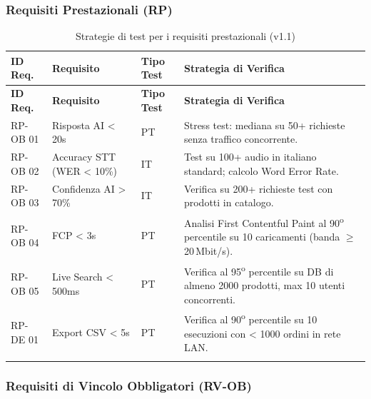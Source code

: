\documentclass[a4paper,11pt,oneside]{scrartcl}
\begin{document}
\newpage
\subsubsection{Requisiti Prestazionali (RP)}

\begin{longtable}{|p{1.5cm}|p{5.5cm}|p{1.8cm}|p{5cm}|}
\hline
\textbf{ID Req.} & \textbf{Requisito} & \textbf{Tipo Test} & \textbf{Strategia di Verifica} \\
\hline
\endfirsthead
\hline
\textbf{ID Req.} & \textbf{Requisito} & \textbf{Tipo Test} & \textbf{Strategia di Verifica} \\
\hline
\endhead

RP-OB 01 & Risposta AI < 20s & PT & Stress test: mediana su 50+ richieste senza traffico concorrente. \\ \hline
RP-OB 02 & Accuracy STT (WER < 10\%) & IT & Test su 100+ audio in italiano standard; calcolo Word Error Rate. \\ \hline
RP-OB 03 & Confidenza AI > 70\% & IT & Verifica su 200+ richieste test con prodotti in catalogo. \\ \hline
RP-OB 04 & FCP < 3s & PT & Analisi First Contentful Paint al 90\textsuperscript{o} percentile su 10 caricamenti (banda $\ge$ 20\,Mbit/s). \\ \hline
RP-OB 05 & Live Search < 500ms & PT & Verifica al 95\textsuperscript{o} percentile su DB di almeno 2000 prodotti, max 10 utenti concorrenti. \\ \hline
RP-DE 01 & Export CSV < 5s & PT & Verifica al 90\textsuperscript{o} percentile su 10 esecuzioni con < 1000 ordini in rete LAN. \\ \hline
\caption{Strategie di test per i requisiti prestazionali (v1.1)}
\end{longtable}

\newpage
\subsubsection{Requisiti di Vincolo Obbligatori (RV-OB)}
\end{document}
